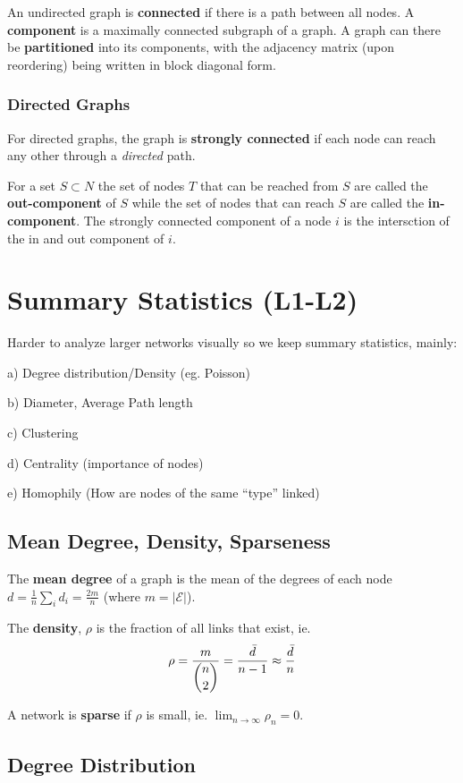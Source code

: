 \documentclass[9pt]{article}
\begin{document}
\begin{multicols}{2}
An undirected graph is \textbf{connected} if there is a path between all nodes. A \textbf{component} is a maximally connected subgraph of a graph. A graph can there be \textbf{partitioned} into
its components, with the adjacency matrix (upon reordering) being
written in block diagonal form.

\subsubsection{Directed Graphs}
For directed graphs, the graph is \textbf{strongly connected} if each node can reach any other through a \textit{directed} path.

For a set $S \subset N$ the set of nodes $T$ that can be reached from $S$ are
called the \textbf{out-component} of $S$ while the set of nodes that can reach
$S$ are called the \textbf{in-component}. The strongly connected component of
a node $i$ is the intersction of the in and out component of $i$.

\section{Summary Statistics (L1-L2)}

Harder to analyze larger networks visually so we keep summary statistics, mainly:

a) Degree distribution/Density (eg. Poisson)

b) Diameter, Average Path length

c) Clustering 

d) Centrality  (importance of nodes)

e) Homophily (How are nodes of the same ``type'' linked)

\subsection{Mean Degree, Density, Sparseness}

The \textbf{mean degree} of a graph is the mean of the degrees of
each node $d = \frac{1}{n}\sum_{i}d_i=\frac{2m}{n}$ (where $m=|\mathcal{E}|$). 

The \textbf{density}, $\rho$ is the fraction of all links that
exist, ie. $$\rho=\frac{m}{\dbinom{n}{2}}=\frac{\bar d}{n-1} \approx \frac{\bar d}{n}$$

A network is \textbf{sparse} if $\rho$ is small, ie. $\lim_{n \to \infty} \rho_n = 0$. 

\subsection{Degree Distribution}


\end{multicols}
\end{document}
